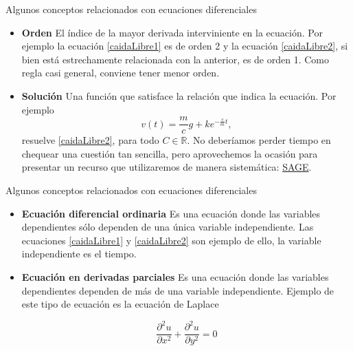 \documentclass[handout,hyperref={colorlinks=true}]{beamer}
\newcommand{\rr}{\mathbb{R}}
\newcommand{\nl}{\onslide<+-> }
\begin{document}
\begin{frame}{Algunos conceptos relacionados con ecuaciones diferenciales}
\begin{itemize}
\nl  \item \textbf{Orden} El índice de la mayor derivada interviniente en la ecuación. Por ejemplo la ecuación \eqref{caidaLibre1} es de orden 2 y la
ecuación \eqref{caidaLibre2}, si bien está estrechamente relacionada con la anterior, es de orden 1. Como regla casi general, conviene tener menor orden.

\nl  \item \textbf{Solución} Una función que satisface la relación que indica la ecuación. Por ejemplo
\begin{equation}\label{SolGencaidaLibre2} v(t)=\frac{m}{c}g+ke^{-\frac{c}{m}t},\end{equation}
resuelve \eqref{caidaLibre2}, para todo $C\in\rr$. No deberíamos perder tiempo en chequear una cuestión tan sencilla, pero aprovechemos la ocasión para presentar 
un recurso que utilizaremos de manera sistemática: \href{https://sage.ccad.unrc.edu.ar/home/pub/63/}{SAGE}.

\end{itemize}

 

\end{frame}

\begin{frame}{Algunos conceptos relacionados con ecuaciones diferenciales}
\begin{itemize}
\nl  \item \textbf{Ecuación diferencial ordinaria} Es una ecuación donde las variables dependientes sólo dependen de una única variable independiente. Las 
ecuaciones \eqref{caidaLibre1} y \eqref{caidaLibre2} son ejemplo de ello, la variable independiente es el tiempo.
\nl  \item \textbf{Ecuación en derivadas parciales} Es una ecuación donde las variables dependientes dependen de más de una variable independiente. 
Ejemplo de este tipo de ecuación es la ecuación de Laplace

\[\frac{\partial^2 u}{\partial x^2}+\frac{\partial^2 u}{\partial y^2}=0\]

\end{itemize}
\end{frame}
\end{document}
